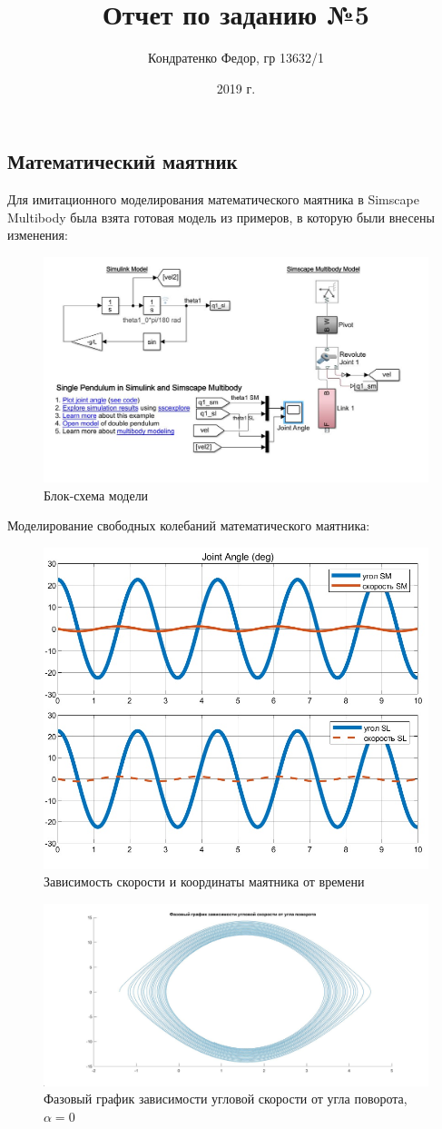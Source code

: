 \documentclass{article}
\date{2019 г.}
\author{Кондратенко Федор, гр 13632/1}
\title{Отчет по заданию №5}
\begin{document}
	\maketitle
	\subsection*{Математический маятник}
	Для имитационного моделирования математического маятника в Simscape Multibody была взята готовая модель из примеров, в которую были внесены изменения:
	\begin{figure}[H]
		\centering
		\includegraphics[width=0.7\linewidth]{model1}
		\caption{Блок-схема модели}
		\label{fig:model}
	\end{figure}
	Моделирование свободных колебаний математического маятника:
	\begin{figure}[H]
		\centering
		\includegraphics[width=0.7\linewidth]{k1}
		\caption{Зависимость скорости и координаты маятника от времени}
		\label{fig:k1}
	\end{figure}
	\begin{figure}[H]
		\centering
		\includegraphics[width=0.7\linewidth]{phase1}
		\caption{Фазовый график зависимости угловой скорости от угла поворота, $\alpha = 0$}
		\label{fig:phase1}
	\end{figure}
\end{document}
